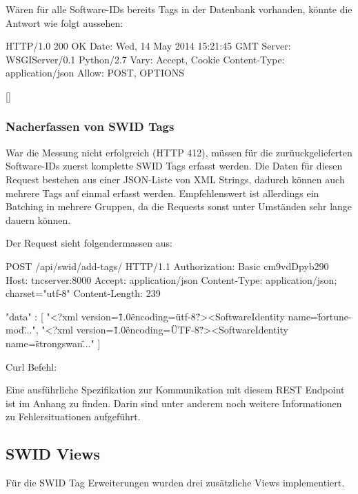 Wären für alle Software-IDs bereits Tags in der Datenbank vorhanden, könnte die Antwort wie folgt aussehen:

\begin{httpcode}
HTTP/1.0 200 OK
Date: Wed, 14 May 2014 15:21:45 GMT
Server: WSGIServer/0.1 Python/2.7
Vary: Accept, Cookie
Content-Type: application/json
Allow: POST, OPTIONS

[]
\end{httpcode}

\subsubsection*{Nacherfassen von SWID Tags}
War die Messung nicht erfolgreich (HTTP 412), müssen für die zurüuckgelieferten Software-IDs
zuerst komplette SWID Tags erfasst werden. Die Daten für diesen Request bestehen aus einer JSON-Liste von XML Strings, dadurch können auch
mehrere Tags auf einmal erfasst werden. Empfehlenswert ist allerdings ein Batching in mehrere Gruppen, da die Requests sonst unter Umständen sehr lange
dauern können. 

\pagebreak
Der Request sieht folgendermassen aus:

\begin{httpcode}
POST /api/swid/add-tags/ HTTP/1.1
Authorization: Basic cm9vdDpyb290
Host: tncserver:8000
Accept: application/json
Content-Type: application/json; charset="utf-8"
Content-Length: 239

{ "data" : 
	[
		"<?xml version=\"1.0\" encoding=\"utf-8\"?><SoftwareIdentity name=\"fortune-mod\"...",
		"<?xml version=\"1.0\" encoding=\"UTF-8\"?><SoftwareIdentity name=\"strongswan\"..."
	]
}
\end{httpcode}

Curl Befehl:


Eine ausführliche Spezifikation zur Kommunikation mit diesem REST Endpoint ist im Anhang  zu finden.
Darin sind unter anderem noch weitere Informationen zu Fehlersituationen aufgeführt.

\subsection{SWID Views}
Für die SWID Tag Erweiterungen wurden drei zusätzliche Views implementiert.
